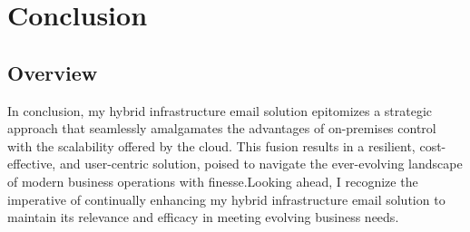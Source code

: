 \chapter{Conclusion}
\section{Overview}
In conclusion, my hybrid infrastructure email solution epitomizes a strategic approach that seamlessly amalgamates the advantages of on-premises control with the scalability offered by the cloud. This fusion results in a resilient, cost-effective, and user-centric solution, poised to navigate the ever-evolving landscape of modern business operations with finesse.Looking ahead, I recognize the imperative of continually enhancing my hybrid infrastructure email solution to maintain its relevance and efficacy in meeting evolving business needs.
